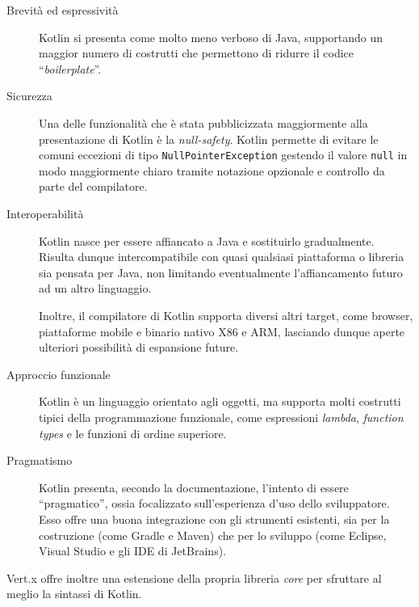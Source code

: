       \begin{description}
        \item[Brevità ed espressività]
          Kotlin si presenta come molto meno verboso di Java, supportando un maggior numero di costrutti che permettono di ridurre il codice ``\emph{boilerplate}''.

        \item[Sicurezza]
          Una delle funzionalità che è stata pubblicizzata maggiormente alla presentazione di Kotlin è la \emph{null-safety}.
          Kotlin permette di evitare le comuni eccezioni di tipo \texttt{NullPointerException} gestendo il valore \texttt{null} in modo maggiormente chiaro tramite notazione opzionale e controllo da parte del compilatore.

        \item[Interoperabilità]
          Kotlin nasce per essere affiancato a Java e sostituirlo gradualmente.
          Risulta dunque intercompatibile con quasi qualsiasi piattaforma o libreria sia pensata per Java, non limitando eventualmente l'affiancamento futuro ad un altro linguaggio.

          Inoltre, il compilatore di Kotlin supporta diversi altri target, come browser, piattaforme mobile e binario nativo X86 e ARM, lasciando dunque aperte ulteriori possibilità di espansione future.

        \item[Approccio funzionale]
          Kotlin è un linguaggio orientato agli oggetti, ma supporta molti costrutti tipici della programmazione funzionale, come espressioni \emph{lambda}, \emph{function types} e le funzioni di ordine superiore.


        \item[Pragmatismo]
          Kotlin presenta, secondo la documentazione, l'intento di essere ``pragmatico'', ossia focalizzato sull'esperienza d'uso dello sviluppatore.
          Esso offre una buona integrazione con gli strumenti esistenti, sia per la costruzione (come Gradle e Maven) che per lo sviluppo (come Eclipse, Visual Studio e gli IDE di JetBrains).
      \end{description}

      Vert.x offre inoltre una estensione della propria libreria \emph{core} per sfruttare al meglio la sintassi di Kotlin.

